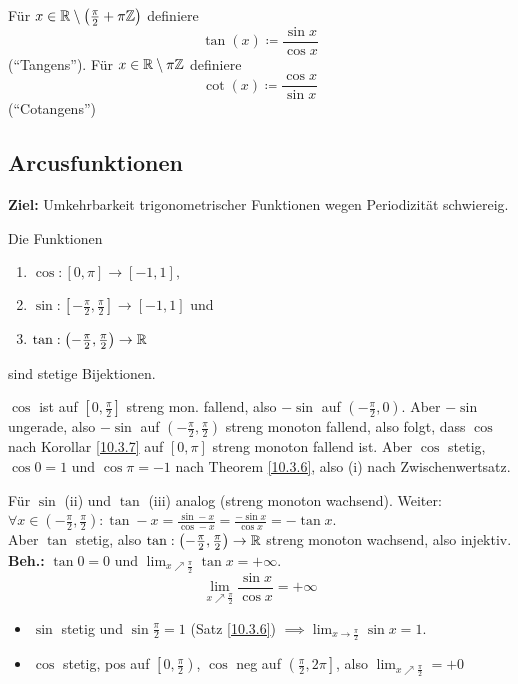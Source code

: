 \begin{subdefinition}
	Für $ x \in \mathbb{R} \setminus \left(\frac{ \pi }{ 2 } + \pi \mathbb{Z} \right) $ definiere
	\[
		\tan(x) \coloneqq \frac{ \sin x }{ \cos x } 
	\]
	(``Tangens''). Für $ x \in \mathbb{R} \setminus \pi \mathbb{Z}  $ definiere
	\[
		\cot (x) \coloneqq \frac{ \cos x }{ \sin x } 
	\]
	(``Cotangens'')
\end{subdefinition}

\subsection{Arcusfunktionen}
\textbf{Ziel:} Umkehrbarkeit trigonometrischer Funktionen wegen Periodizität schwiereig.
\begin{sublemma}
	Die Funktionen
	\begin{enumerate}[label=(\roman*)]
		\item $ \cos : [0, \pi] \to [-1, 1], $ 
		\item $ \sin : \left[-\frac{ \pi }{ 2 } , \frac{ \pi }{ 2 } \right] \to [-1, 1] $ und
		\item $ \tan : \left(-\frac{ \pi }{ 2 } , \frac{ \pi }{ 2 } \right) \to \mathbb{R}  $
	\end{enumerate}
	sind stetige Bijektionen.
\end{sublemma}
\begin{subproof*}
	$ \cos  $ ist auf $ [0, \frac{ \pi }{ 2 }] $ streng mon. fallend, also $ -\sin  $ auf $ \left( -\frac{ \pi }{ 2 } , 0 \right) $. Aber $ -\sin  $ ungerade, also $ -\sin  $ auf $ \left( -\frac{ \pi }{ 2 } , \frac{ \pi }{ 2 } \right) $ streng monoton fallend, also folgt, dass $ \cos  $ nach Korollar \ref{10.3.7} auf $ [0, \pi]  $ streng monoton fallend ist. Aber $ \cos  $ stetig, $ \cos 0 = 1 $ und $ \cos \pi = -1 $ nach Theorem \ref{10.3.6}, also (i) nach Zwischenwertsatz.

	Für $ \sin  $ (ii) und $ \tan $ (iii) analog (streng monoton wachsend). Weiter:\\
	$ \forall x \in \left( -\frac{ \pi }{ 2 } , \frac{ \pi }{ 2 } \right): \tan -x = \frac{ \sin -x }{ \cos  -x } = \frac{ -\sin x }{ \cos x } = -\tan x $.\\
	Aber $ \tan  $ stetig, also $ \tan : \left( - \frac{ \pi }{ 2 } , \frac{ \pi }{ 2 }\right) \to \mathbb{R}  $ streng monoton wachsend, also injektiv.\\
	\textbf{Beh.:} $ \tan 0 = 0 $ und $ \lim_{x \nearrow \frac{ \pi }{ 2 } } \tan x = +\infty $.
	\[
		\lim_{x \nearrow \frac{ \pi }{ 2 } } \frac{ \sin x }{ \cos x } = +\infty
	\]
	\begin{itemize}
		\item $ \sin  $ stetig und $ \sin \frac{ \pi }{ 2 } = 1 $ (Satz \ref{10.3.6}) $ \implies \lim_{x \to \frac{ \pi }{ 2 } } \sin x = 1. $ 
		\item $ \cos  $ stetig, pos auf $ \left[0, \frac{ \pi }{ 2 } \right) $, $ \cos  $ neg auf $ \left( \frac{ \pi }{ 2 } , 2\pi  \right] $, also $ \lim_{x \nearrow \frac{ \pi }{ 2 } } = +0 $
	\end{itemize}
\end{subproof*}


